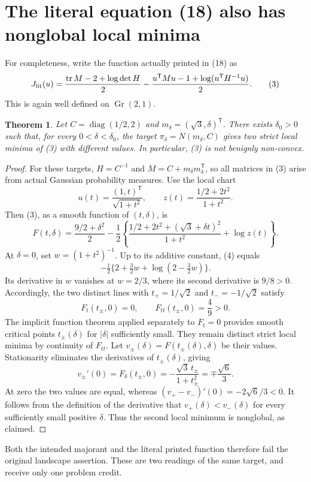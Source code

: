 \documentclass[11pt]{article}
\newtheorem{theorem}{Theorem}
\newcommand{\Gr}{\operatorname{Gr}}
\newcommand{\tr}{\operatorname{tr}}
\newcommand{\diag}{\operatorname{diag}}
\begin{document}
\section*{The literal equation (18) also has nonglobal local minima}
For completeness, write the function actually printed in (18) as
\[
 J_{\rm lit}(u)=\frac{\tr M-2+\log\det H}{2}
 -\frac{u^{\mathsf T}Mu-1+\log(u^{\mathsf T}H^{-1}u)}2.       \tag{3}
\]
This is again well defined on $\Gr(2,1)$.
\begin{theorem}
Let $C=\diag(1/2,2)$ and $m_\delta=(\sqrt3,\delta)^{\mathsf T}$.
There exists $\delta_0>0$ such that, for every $0<\delta<\delta_0$,
the target $\pi_\delta=N(m_\delta,C)$ gives two strict local minima of
(3) with different values. In particular, (3) is not benignly non-convex.
\end{theorem}
\begin{proof}
For these targets, $H=C^{-1}$ and $M=C+m_\delta m_\delta^{\mathsf T}$,
so all matrices in (3) arise from actual Gaussian probability measures.
Use the local chart
\[
 u(t)=\frac{(1,t)^{\mathsf T}}{\sqrt{1+t^2}},\qquad
 z(t)=\frac{1/2+2t^2}{1+t^2}.
\]
Then (3), as a smooth function of $(t,\delta)$, is
\[
 F(t,\delta)=\frac{9/2+\delta^2}{2}
 -\frac12\left\{
 \frac{1/2+2t^2+(\sqrt3+\delta t)^2}{1+t^2}+\log z(t)\right\}.
                                                               \tag{4}
\]
At $\delta=0$, set $w=(1+t^2)^{-1}$. Up to its additive constant,
(4) equals
\[
 -\tfrac12\{2+\tfrac32 w+\log(2-\tfrac32w)\}.
\]
Its derivative in $w$ vanishes at $w=2/3$, where its second derivative
is $9/8>0$. Accordingly, the two distinct lines with
$t_+=1/\sqrt2$ and $t_-=-1/\sqrt2$ satisfy
\[
 F_t(t_\pm,0)=0,\qquad F_{tt}(t_\pm,0)=\frac49>0.
\]
The implicit function theorem applied separately to $F_t=0$ provides
smooth critical points $t_\pm(\delta)$ for $|\delta|$ sufficiently small.
They remain distinct strict local minima by continuity of $F_{tt}$.
Let $v_\pm(\delta)=F(t_\pm(\delta),\delta)$ be their values.
Stationarity eliminates the derivatives of $t_\pm(\delta)$, giving
\[
 v_\pm'(0)=F_\delta(t_\pm,0)
 =-\frac{\sqrt3\,t_\pm}{1+t_\pm^2}
 =\mp\frac{\sqrt6}{3}.
\]
At zero the two values are equal, whereas
$(v_+-v_-)'(0)=-2\sqrt6/3<0$. It follows from the definition of the
derivative that $v_+(\delta)<v_-(\delta)$ for every sufficiently small
positive $\delta$. Thus the second local minimum is nonglobal, as claimed.
\end{proof}

Both the intended majorant and the literal printed function therefore
fail the original landscape assertion. These are two readings of the
same target, and receive only one problem credit.
\end{document}
